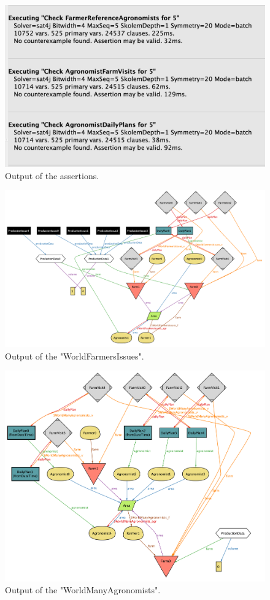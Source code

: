\documentclass{article}
\begin{document}
\newpage
\clearpage
\begin{figure}
    \centering
     \includegraphics[scale=0.45]{alloy output/assertions.png}
    \caption{Output of the assertions.}
\end{figure}
\clearpage
\newpage
\clearpage
\begin{figure}
    \centering
    \includegraphics[scale=0.45]{alloy output/worldfarmersissues.png}
    \caption{Output of the "WorldFarmersIssues".}
\end{figure}
\clearpage
\newpage
\clearpage
\begin{figure}
    \centering
    \includegraphics[scale=0.45]{alloy output/worldmanyagronomists.png}
    \caption{Output of the "WorldManyAgronomists".}
\end{figure}
\end{document}
